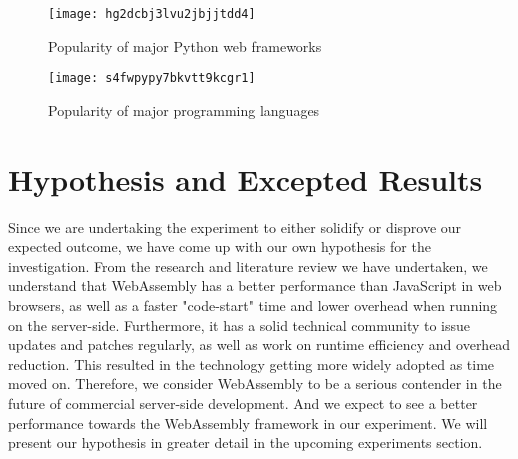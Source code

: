 \newpage
\bigskip
\begin{figure}[hp]
\centering
\texttt{[image: hg2dcbj3lvu2jbjjtdd4]}
\caption{\footnotesize{Popularity of major Python web frameworks \cite{eva4}}}
\captionsetup{aboveskip=0pt,font=it}
\end{figure}
\bigskip

\bigskip
\begin{figure}[hp]
\centering
\texttt{[image: s4fwpypy7bkvtt9kcgr1]}
\caption{\footnotesize{Popularity of major programming languages \cite{eva4}}}
\captionsetup{aboveskip=0pt,font=it}
\end{figure}
\bigskip

\bigskip
\section{Hypothesis and Excepted Results}

Since we are undertaking the experiment to either solidify or disprove our expected outcome, we have come up with our own hypothesis for the investigation. From the research and literature review we have undertaken, we understand that WebAssembly has a better performance than JavaScript in web browsers, as well as a faster "code-start" time and lower overhead when running on the server-side. Furthermore, it has a solid technical community to issue updates and patches regularly, as well as work on runtime efficiency and overhead reduction. This resulted in the technology getting more widely adopted as time moved on. Therefore, we consider WebAssembly to be a serious contender in the future of commercial server-side development. And we expect to see a better performance towards the WebAssembly framework in our experiment. We will present our hypothesis in greater detail in the upcoming experiments section.